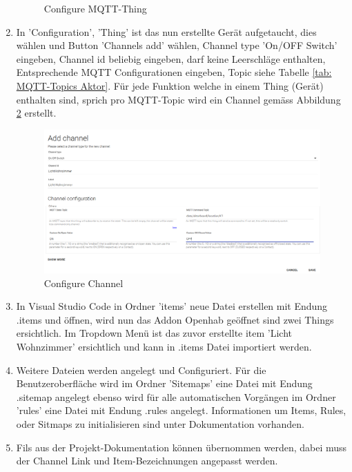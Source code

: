 \begin{enumerate}
\begin{figure}[H]
	\caption{Configure MQTT-Thing} 	
	\label{pic: Configure MQTT-Thing}
\end{figure} 
\item In 'Configuration', 'Thing' ist das nun erstellte Gerät aufgetaucht, dies wählen und Button 'Channels add' wählen, Channel type 'On/OFF Switch' eingeben, Channel id beliebig eingeben, darf keine Leerschläge enthalten, Entsprechende MQTT Configurationen eingeben, Topic siehe Tabelle \ref{tab: MQTT-Topics Aktor}. Für jede Funktion welche in einem Thing (Gerät) enthalten sind, sprich pro MQTT-Topic wird ein Channel gemäss Abbildung \ref{pic: Configure Channel} erstellt.
   \begin{figure}[H]
	\centering
	\includegraphics[width=\textwidth]{graphics/Channel.PNG}
	\caption{Configure Channel} 	
	\label{pic: Configure Channel}
\end{figure} 
\item In Visual Studio Code in Ordner 'items' neue Datei erstellen mit Endung .items und öffnen, wird nun das Addon Openhab geöffnet sind zwei Things ersichtlich. Im Tropdown Menü ist das zuvor erstellte item 'Licht Wohnzimmer' ersichtlich und kann in .items Datei importiert werden.
\item Weitere Dateien werden angelegt und Configuriert. Für die Benutzeroberfläche wird im Ordner 'Sitemaps' eine Datei mit Endung .sitemap angelegt ebenso wird für alle automatischen Vorgängen im Ordner 'rules' eine Datei mit Endung .rules angelegt. Informationen um Items, Rules, oder Sitmaps zu initialisieren sind unter Dokumentation \cite{noauthor_introduction_nodate} vorhanden.
\item	Fils aus der Projekt-Dokumentation können übernommen werden, dabei muss der Channel Link und Item-Bezeichnungen angepasst werden.
\end{enumerate}	
